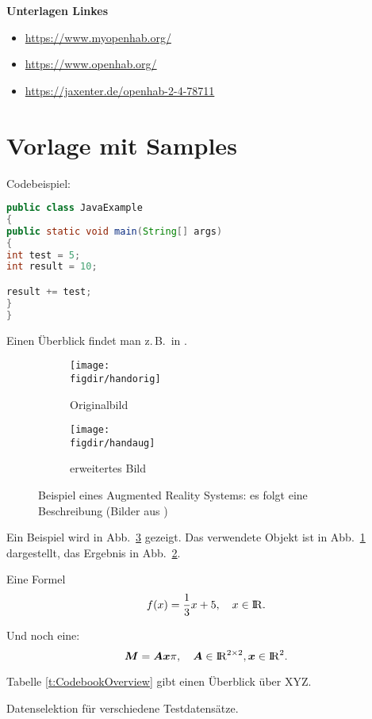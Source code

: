 \textbf{Unterlagen Linkes}
\begin{itemize}
	\item \url{https://www.myopenhab.org/}
	\item \url{https://www.openhab.org/}
	\item \url{https://jaxenter.de/openhab-2-4-78711}
\end{itemize}


\section{Vorlage mit Samples}

Codebeispiel:
\begin{lstlisting}[language=java,firstnumber=1,caption=Java Beispiel,label=lst:example]
public class JavaExample 
{
public static void main(String[] args) 
{
int test = 5;
int result = 10;

result += test;
}
}
\end{lstlisting}

Einen Überblick findet man z.\,B.\ in \cite{Auer00:HTF}.

\begin{figure}[t]
	\centering
	
	\begin{subfigure}{0.45\linewidth}
		\centering
		\texttt{[image: \\figdir/handorig]}
		\caption{Originalbild}
		\label{FIG:arexorig}
	\end{subfigure}
	\begin{subfigure}{0.45\linewidth}
		\centering
		\texttt{[image: \\figdir/handaug]}
		\caption{erweitertes Bild}
		\label{FIG:arexaugm}
	\end{subfigure}
	\caption[AR Beispiel]
	{Beispiel eines Augmented Reality Systems: es folgt eine Beschreibung (Bilder aus \cite{Schmidt01:PAO})}
	\label{FIG:arex}
\end{figure}

Ein Beispiel wird in Abb.\ \ref{FIG:arex} gezeigt.
Das verwendete Objekt ist in Abb.\ \ref{FIG:arexorig} dargestellt, das Ergebnis in Abb.\ \ref{FIG:arexaugm}.

Eine Formel
\begin{equation}
\label{eq:cvp:test}
f(x) = \frac{1}{3} x + 5, \quad x \in \mathord{\mathrm{I\!R}}.
\end{equation}

Und noch eine:
\begin{equation}
\label{eq:cvp:matvec}
\bm{M}  = \bm{Ax} \pi, \quad \bm{A} \in \mathord{\mathrm{I\!R}}^{2 \times 2}, \bm{x} \in \mathord{\mathrm{I\!R}}^2.
\end{equation}

Tabelle \ref{t:CodebookOverview} gibt einen Überblick über XYZ.

\begin{table}[t]
	\centering\small
	
	\caption[Testtabelle]{Datenselektion für verschiedene Testdatensätze.}
	\label{t:CodebookOverview}
\end{table}


